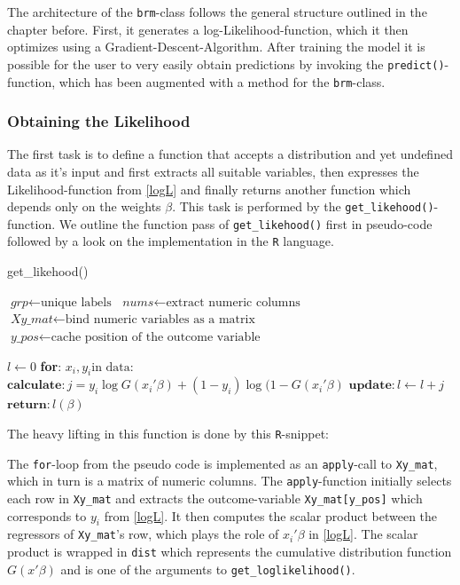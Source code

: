 \documentclass{article}
\begin{document}
The architecture of the \texttt{brm}-class follows the general structure outlined in the chapter before. First, it generates a log-Likelihood-function, which it then optimizes using a Gradient-Descent-Algorithm. After training the model it is possible for the user to very easily obtain predictions by invoking the \texttt{predict()}-function, which has been augmented with a method for the \texttt{brm}-class.

\subsubsection{Obtaining the Likelihood}

The first task is to define a function that accepts a distribution and yet undefined data as it's input and first extracts all suitable variables, then expresses the Likelihood-function from \ref{logL} and finally returns another function which depends only on the weights $\beta$. This task is performed by the \texttt{get\_likehood()}-function. We outline the function pass of \texttt{get\_likehood()} first in pseudo-code followed by a look on the implementation in the \texttt{R} language.

\begin{algorithm}
\caption{get\_likehood()}\label{getllog}
\begin{algorithmic}[1]
\State $\textit{grp} \gets \text{unique labels}$
\State $\textit{nums} \gets \text{extract numeric columns}$
\State $\textit{Xy\_mat} \gets \text{bind numeric variables as a matrix}$
\State $\textit{y\_pos} \gets \text{cache position of the outcome variable}$
\EndProcedure

\State $\textit{l} \gets 0$
\State \textbf{for}: $x_i, y_i \text{in data}:$
\State \qquad $\textbf{calculate}: j = y_i \log G(x_i\prime \beta) +
               (1-y_i) \log (1-G(x_i\prime \beta)$
\State \qquad $\textbf{update}: l \gets l + j$
\State $\textbf{return}: l(\beta)$
\EndProcedure
\end{algorithmic}
\end{algorithm}

The heavy lifting in this function is done by this \texttt{R}-snippet:


The \texttt{for}-loop from the pseudo code is implemented as an \texttt{apply}-call to \texttt{Xy\_mat}, which in turn is a matrix of numeric columns. The \texttt{apply}-function initially selects each row in \texttt{Xy\_mat} and extracts the outcome-variable \texttt{Xy\_mat[y\_pos]} which corresponds to $y_i$ from \ref{logL}. It then computes the scalar product between the regressors of \texttt{Xy\_mat}'s row, which plays the role of $x_i \prime \beta$ in \ref{logL}. The scalar product is wrapped in \texttt{dist} which represents the cumulative distribution function $G(x\prime\beta)$ and is one of the arguments to \texttt{get\_loglikelihood()}.
\end{document}

